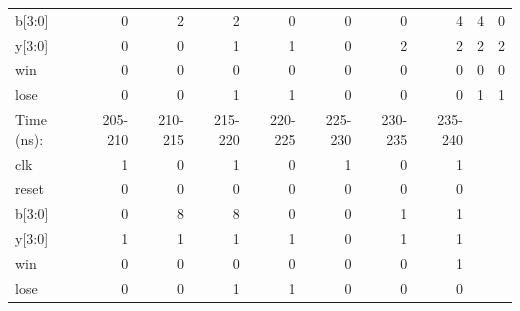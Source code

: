 \documentclass[11pt]{article}
\begin{document}
\begin{table}[ht]
\begin{tabular}{l|rrrrrrrrr}
		b[3:0] & 0 & 2 & 2 & 0 & 0 & 0 & 4 & 4 & 0   \\
		y[3:0] & 0 & 0 & 1& 1 & 0 & 2 & 2 & 2 & 2   \\
		\midrule
		win & 0 & 0 & 0 & 0  & 0 & 0 & 0 & 0 & 0  \\
		lose & 0 & 0 &1 & 1 & 0 & 0 & 0 & 1 & 1   \\
		\midrule
		Time (ns):& 205-210 & 210-215 & 215-220 & 220-225 & 225-230 & 230-235 & 235-240\\
		\midrule
		clk & 1  & 0 & 1 & 0 & 1 & 0 & 1 \\
		reset & 0 & 0 & 0 & 0 & 0 & 0 & 0 \\
		b[3:0] & 0 & 8 & 8& 0 & 0 & 1 & 1   \\
		y[3:0] & 1 & 1 & 1& 1 & 0 & 1 & 1   \\
		\midrule
		win & 0 & 0 & 0 & 0  & 0 & 0 & 1  \\
		lose & 0 & 0 & 1 & 1 & 0 & 0 & 0 \\
		\bottomrule
	\end{tabular}
\end{table}
\end{document}
